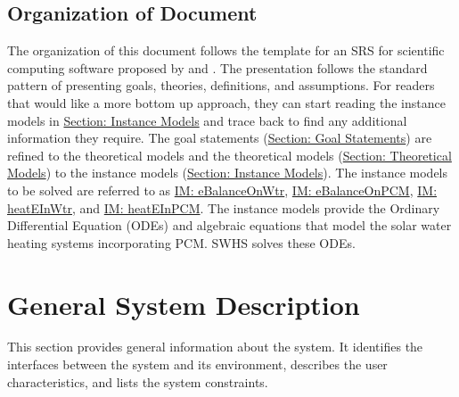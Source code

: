 \documentclass[12pt]{article}
\begin{document}
\subsection{Organization of Document}
\label{Sec:DocOrg}
The organization of this document follows the template for an SRS for scientific computing software proposed by \cite{dParnas1972} and \cite{parnasClements1984}. The presentation follows the standard pattern of presenting goals, theories, definitions, and assumptions. For readers that would like a more bottom up approach, they can start reading the instance models in \hyperref[Sec:IMs]{Section: Instance Models} and trace back to find any additional information they require.
The goal statements (\hyperref[Sec:GoalStmt]{Section: Goal Statements}) are refined to the theoretical models and the theoretical models (\hyperref[Sec:TMs]{Section: Theoretical Models}) to the instance models (\hyperref[Sec:IMs]{Section: Instance Models}). The instance models to be solved are referred to as \hyperref[IM:eBalanceOnWtr]{IM: eBalanceOnWtr}, \hyperref[IM:eBalanceOnPCM]{IM: eBalanceOnPCM}, \hyperref[IM:heatEInWtr]{IM: heatEInWtr}, and \hyperref[IM:heatEInPCM]{IM: heatEInPCM}. The instance models provide the Ordinary Differential Equation (ODEs) and algebraic equations that model the solar water heating systems incorporating PCM. SWHS solves these ODEs.
\section{General System Description}
\label{Sec:GenSysDesc}
This section provides general information about the system. It identifies the interfaces between the system and its environment, describes the user characteristics, and lists the system constraints.
\end{document}
